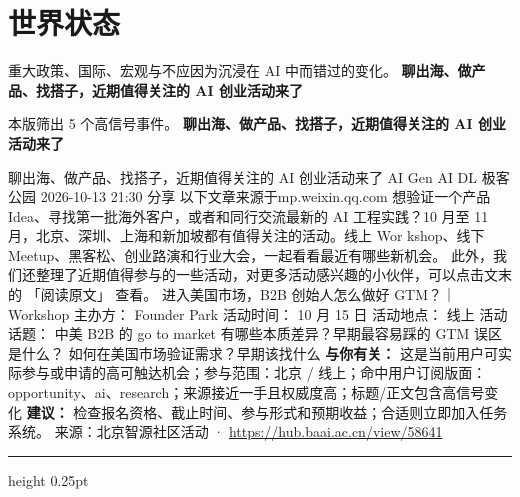 \documentclass[10.5pt]{ctexart}
\begin{document}
\section*{世界状态}
{\color{ormuted} 重大政策、国际、宏观与不应因为沉浸在 AI 中而错过的变化。}
\vspace{2mm}
{\LARGE\bfseries 聊出海、做产品、找搭子，近期值得关注的 AI 创业活动来了}\par
\vspace{1mm}
{\color{ormuted} 本版筛出 5 个高信号事件。}
\vspace{3mm}
{\Large\bfseries 聊出海、做产品、找搭子，近期值得关注的 AI 创业活动来了}\par
聊出海、做产品、找搭子，近期值得关注的 AI 创业活动来了 AI Gen AI DL 极客公园 2026-10-13 21:30 分享 以下文章来源于mp.weixin.qq.com 想验证一个产品 Idea、寻找第一批海外客户，或者和同行交流最新的 AI 工程实践？10 月至 11 月，北京、深圳、上海和新加坡都有值得关注的活动。线上 Wor kshop、线下 Meetup、黑客松、创业路演和行业大会，一起看看最近有哪些新机会。 此外，我们还整理了近期值得参与的一些活动，对更多活动感兴趣的小伙伴，可以点击文末的 「阅读原文」 查看。 进入美国市场，B2B 创始人怎么做好 GTM？｜Workshop 主办方： Founder Park 活动时间： 10 月 15 日 活动地点： 线上 活动话题： 中美 B2B 的 go to market 有哪些本质差异？早期最容易踩的 GTM 误区是什么？ 如何在美国市场验证需求？早期该找什么
\textbf{与你有关：} 这是当前用户可实际参与或申请的高可触达机会；参与范围：北京 / 线上；命中用户订阅版面：opportunity、ai、research；来源接近一手且权威度高；标题/正文包含高信号变化
\textbf{建议：} 检查报名资格、截止时间、参与形式和预期收益；合适则立即加入任务系统。
{\footnotesize\color{ormuted} 来源：北京智源社区活动 · \url{https://hub.baai.ac.cn/view/58641}}
\vspace{4mm}
\hrule height 0.25pt
\vspace{3mm}
\end{document}
